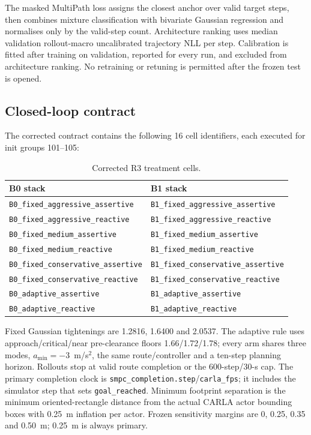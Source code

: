 The masked MultiPath loss assigns the closest anchor over valid target steps,
then combines mixture classification with bivariate Gaussian regression and
normalises only by the valid-step count. Architecture ranking uses median
validation rollout-macro uncalibrated trajectory NLL per step. Calibration is
fitted after training on validation, reported for every run, and excluded from
architecture ranking. No retraining or retuning is permitted after the frozen
test is opened.

\subsection{Closed-loop contract}

The corrected contract contains the following 16 cell identifiers, each
executed for init groups 101--105:

\begin{table}[h]
  \centering\small
  \caption{Corrected R3 treatment cells.}
  \label{tab:app-r3-cells}
  \begin{tabular}{@{}ll@{}}
    \toprule
    B0 stack & B1 stack \\
    \midrule
    \texttt{B0\_fixed\_aggressive\_assertive} & \texttt{B1\_fixed\_aggressive\_assertive} \\
    \texttt{B0\_fixed\_aggressive\_reactive} & \texttt{B1\_fixed\_aggressive\_reactive} \\
    \texttt{B0\_fixed\_medium\_assertive} & \texttt{B1\_fixed\_medium\_assertive} \\
    \texttt{B0\_fixed\_medium\_reactive} & \texttt{B1\_fixed\_medium\_reactive} \\
    \texttt{B0\_fixed\_conservative\_assertive} & \texttt{B1\_fixed\_conservative\_assertive} \\
    \texttt{B0\_fixed\_conservative\_reactive} & \texttt{B1\_fixed\_conservative\_reactive} \\
    \texttt{B0\_adaptive\_assertive} & \texttt{B1\_adaptive\_assertive} \\
    \texttt{B0\_adaptive\_reactive} & \texttt{B1\_adaptive\_reactive} \\
    \bottomrule
  \end{tabular}
\end{table}

Fixed Gaussian tightenings are 1.2816, 1.6400 and 2.0537. The adaptive rule
uses approach/critical/near pre-clearance floors 1.66/1.72/1.78; every arm
shares three modes, $a_{\min}=-3$~m/s$^2$, the same route/controller and a
ten-step planning horizon. Rollouts stop at valid route completion or the
600-step/30-s cap. The primary completion clock is
\texttt{smpc\_completion.step}/\texttt{carla\_fps}; it includes the simulator
step that sets \texttt{goal\_reached}. Minimum footprint separation is the
minimum oriented-rectangle distance from the actual CARLA actor bounding boxes
with 0.25~m inflation per actor. Frozen sensitivity margins are 0, 0.25, 0.35
and 0.50~m; 0.25~m is always primary.

